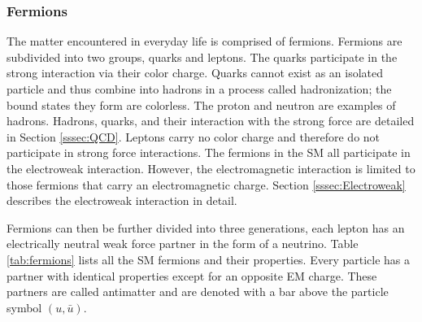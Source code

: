 		\subsubsection{Fermions}\label{sssec:Fermions}
			The matter encountered in everyday life is comprised of fermions. Fermions are subdivided into two groups, quarks and leptons. The quarks participate in the strong interaction via their color charge. Quarks cannot exist as an isolated particle and thus combine into hadrons in a process called hadronization; the bound states they form are colorless. The proton and neutron are examples of hadrons. Hadrons, quarks, and their interaction with the strong force are detailed in Section \ref{sssec:QCD}. Leptons carry no color charge and therefore do not participate in strong force interactions. The fermions in the \gls{SM} all participate in the electroweak interaction. However, the electromagnetic interaction is limited to those fermions that carry an electromagnetic charge. Section \ref{sssec:Electroweak} describes the electroweak interaction in detail.

			Fermions can then be further divided into three generations, each lepton has an electrically neutral weak force partner in the form of a neutrino. Table \ref{tab:fermions} lists all the \gls{SM} fermions and their properties. Every particle has a partner with identical properties except for an opposite \gls{EM} charge. These partners are called antimatter and are denoted with a bar above the particle symbol $(u, \bar{u})$.

